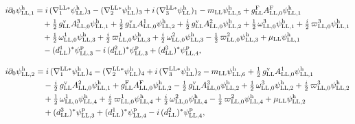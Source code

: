 \documentclass[
  10pt,
]{article}
\begin{document}
\[\begin{aligned}
i\partial_0\psi^{\rm h}_{{\rm LL},1}&=i\,(\nabla^{{\rm LL}*}_1\psi^{\rm h}_{\rm LL})_3-(\nabla^{{\rm LL}*}_2\psi^{\rm h}_{\rm LL})_3+i\,(\nabla^{{\rm LL}*}_3\psi^{\rm h}_{\rm LL})_1-m_{\rm LL}\psi^{\rm h}_{{\rm LL},5}+g^{\rm F}_{\rm LL}A^{\rm F}_{{\rm LL},0}\psi^{\rm h}_{{\rm LL},1}\\
&\quad +\tfrac{1}{2}\,g^{\rm v}_{\rm LL}A^{3}_{{\rm LL},0}\psi^{\rm h}_{{\rm LL},1}+\tfrac{1}{2}\,g^{\rm v}_{\rm LL}A^{1}_{{\rm LL},0}\psi^{\rm h}_{{\rm LL},2}+\tfrac{i}{2}\,g^{\rm v}_{\rm LL}A^{2}_{{\rm LL},0}\psi^{\rm h}_{{\rm LL},2}+\tfrac{1}{2}\,\omega^{3}_{{\rm LL},0}\psi^{\rm h}_{{\rm LL},1}+\tfrac{i}{2}\,\varpi^{3}_{{\rm LL},0}\psi^{\rm h}_{{\rm LL},1}\\
&\quad +\tfrac{1}{2}\,\omega^{1}_{{\rm LL},0}\psi^{\rm h}_{{\rm LL},3}+\tfrac{i}{2}\,\varpi^{1}_{{\rm LL},0}\psi^{\rm h}_{{\rm LL},3}+\tfrac{i}{2}\,\omega^{2}_{{\rm LL},0}\psi^{\rm h}_{{\rm LL},3}-\tfrac{1}{2}\,\varpi^{2}_{{\rm LL},0}\psi^{\rm h}_{{\rm LL},3}+\mu_{\rm LL}\psi^{\rm h}_{{\rm LL},1}\\
&\quad -(d^{1}_{\rm LL})^*\psi^{\rm p}_{{\rm LL},3}-i\,(d^{2}_{\rm LL})^*\psi^{\rm p}_{{\rm LL},3}+(d^{3}_{\rm LL})^*\psi^{\rm p}_{{\rm LL},4},
\end{aligned}\]

\[\begin{aligned}
i\partial_0\psi^{\rm h}_{{\rm LL},2}&=i\,(\nabla^{{\rm LL}*}_1\psi^{\rm h}_{\rm LL})_4-(\nabla^{{\rm LL}*}_2\psi^{\rm h}_{\rm LL})_4+i\,(\nabla^{{\rm LL}*}_3\psi^{\rm h}_{\rm LL})_2-m_{\rm LL}\psi^{\rm h}_{{\rm LL},6}+\tfrac{1}{2}\,g^{\rm v}_{\rm LL}A^{1}_{{\rm LL},0}\psi^{\rm h}_{{\rm LL},1}\\
&\quad -\tfrac{i}{2}\,g^{\rm v}_{\rm LL}A^{2}_{{\rm LL},0}\psi^{\rm h}_{{\rm LL},1}+g^{\rm F}_{\rm LL}A^{\rm F}_{{\rm LL},0}\psi^{\rm h}_{{\rm LL},2}-\tfrac{1}{2}\,g^{\rm v}_{\rm LL}A^{3}_{{\rm LL},0}\psi^{\rm h}_{{\rm LL},2}+\tfrac{1}{2}\,\omega^{3}_{{\rm LL},0}\psi^{\rm h}_{{\rm LL},2}+\tfrac{i}{2}\,\varpi^{3}_{{\rm LL},0}\psi^{\rm h}_{{\rm LL},2}\\
&\quad +\tfrac{1}{2}\,\omega^{1}_{{\rm LL},0}\psi^{\rm h}_{{\rm LL},4}+\tfrac{i}{2}\,\varpi^{1}_{{\rm LL},0}\psi^{\rm h}_{{\rm LL},4}+\tfrac{i}{2}\,\omega^{2}_{{\rm LL},0}\psi^{\rm h}_{{\rm LL},4}-\tfrac{1}{2}\,\varpi^{2}_{{\rm LL},0}\psi^{\rm h}_{{\rm LL},4}+\mu_{\rm LL}\psi^{\rm h}_{{\rm LL},2}\\
&\quad +(d^{3}_{\rm LL})^*\psi^{\rm p}_{{\rm LL},3}+(d^{1}_{\rm LL})^*\psi^{\rm p}_{{\rm LL},4}-i\,(d^{2}_{\rm LL})^*\psi^{\rm p}_{{\rm LL},4},
\end{aligned}\]
\end{document}
